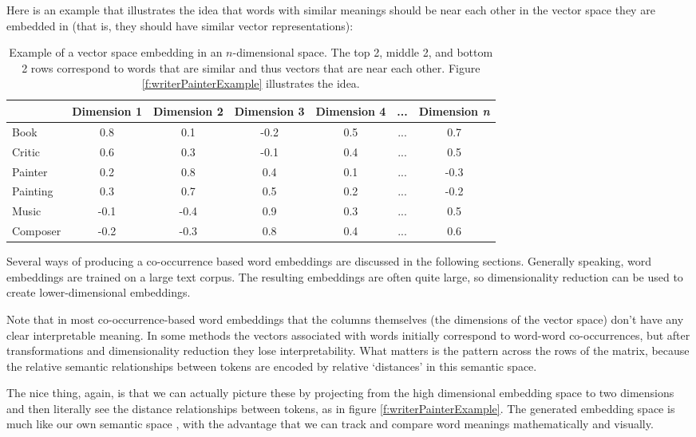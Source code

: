 Here is an example that illustrates the idea that words with similar meanings should be near each other in the vector space they are embedded in (that is, they should have similar vector representations):
\begin{table}[h]
    \centering
    \begin{tabular}{|l|c|c|c|c|c|c|}
    \hline
     & Dimension 1 & Dimension 2 & Dimension 3 & Dimension 4 & ... & Dimension \textit{n} \\
    \hline
    Book    & 0.8 & 0.1 & -0.2 & 0.5 & ... & 0.7  \\
    \hline
    Critic  & 0.6 & 0.3 & -0.1 & 0.4 & ... & 0.5  \\
    \hline
    Painter & 0.2 & 0.8 & 0.4 & 0.1 & ... & -0.3 \\
    \hline
    Painting& 0.3 & 0.7 & 0.5 & 0.2 & ... & -0.2  \\
    \hline
    Music   & -0.1 & -0.4 & 0.9 & 0.3 & ... & 0.5  \\
    \hline
    Composer& -0.2 & -0.3 & 0.8 & 0.4 & ... & 0.6 \\
    \hline
    \end{tabular}
    \caption{Example of a vector space embedding in an $n$-dimensional space. The top 2, middle 2, and bottom 2 rows correspond to words that are similar and thus vectors that are near each other.  Figure \ref{f:writerPainterExample} illustrates the idea.}
    \label{exampleEmbeddings}
\end{table}

Several ways of producing a co-occurrence based word embeddings are discussed in the following sections. Generally speaking, word embeddings are trained on a large text corpus. The resulting embeddings are often quite large, so dimensionality reduction can be used to create lower-dimensional embeddings. 

Note that in most co-occurrence-based word embeddings that the columns themselves (the dimensions of the vector space) don't have any clear interpretable meaning. In some methods the vectors associated with words initially correspond to word-word co-occurrences, but after transformations and dimensionality reduction they lose interpretability. What matters is the pattern across the rows of the matrix, because the relative semantic relationships between tokens are encoded by relative `distances' in this semantic space. 

The nice thing, again, is that we can actually picture these by projecting from the high dimensional embedding space to two dimensions and then literally see the distance relationships between tokens, as in figure \ref{f:writerPainterExample}. The generated embedding space is much like our own semantic space \cite{lewis2019distributional}, with the advantage that we can track and compare word meanings mathematically and visually.


